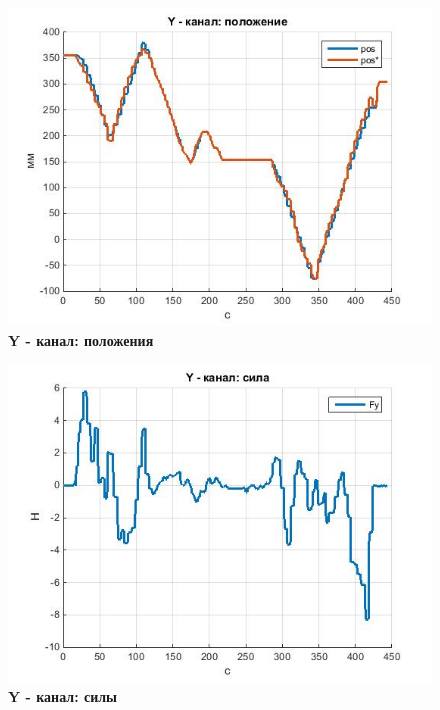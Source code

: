 \documentclass[a4paper,14pt,russian]{extreport} \usepackage{extsizes}
\begin{document}
		\begin{figure}[h]
			\centering		 
			\includegraphics[width=5.5in]{./graph/posY.jpg}	
			\caption{
				\textbf{Y - канал: положения}
			}
			\label{fig_img43}
		\end{figure}
		\begin{figure}[h]
			\centering		 
			\includegraphics[width=5.5in]{./graph/powY.jpg}	
			\caption{
				\textbf{Y - канал: силы}
			}
			\label{fig_img44}
		\end{figure}
\end{document}

